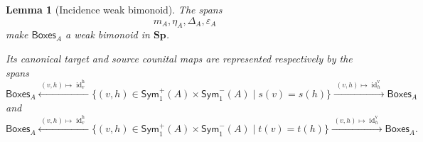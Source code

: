\documentclass[oneside]{article}
\newcommand{\Boxes}{\mathsf{Boxes}}
\newcommand{\Sym}{\mathsf{Sym}}
\newcommand{\Sp}{\mathbf{Sp}}
\newcommand{\id}{\operatorname{id}}
\theoremstyle{plain}
\newtheorem{lemma}[theorem]{Lemma}
\theoremstyle{definition}
\theoremstyle{remark}
\begin{document}
\begin{lemma}[Incidence weak bimonoid]
\label{lem:cgqg-game-incidence-weak-bimonoid}
    The spans
    \[
        m_A,\eta_A,\Delta_A,\varepsilon_A
    \]
    make \(\Boxes_A\) a weak bimonoid in \(\Sp\).

    Its canonical target and source counital maps are represented respectively by the spans
    \begin{equation}
        \Boxes_A
        \xleftarrow{\;(v,h)\mapsto\id_v^{\mathrm h}\;}
        \bigl\{
            (v,h)\in\Sym^+_1(A)\times\Sym^-_1(A)
            \mid s(v)=s(h)
        \bigr\}
        \xrightarrow{\;(v,h)\mapsto\id_h^{\mathrm v}\;}
        \Boxes_A
        \label{eq:cgqg-game-target-counital-map}
    \end{equation}
    and
    \begin{equation}
        \Boxes_A
        \xleftarrow{\;(v,h)\mapsto\id_v^{\mathrm h}\;}
        \bigl\{
            (v,h)\in\Sym^+_1(A)\times\Sym^-_1(A)
            \mid t(v)=t(h)
        \bigr\}
        \xrightarrow{\;(v,h)\mapsto\id_h^{\mathrm v}\;}
        \Boxes_A.
        \label{eq:cgqg-game-source-counital-map}
    \end{equation}
\end{lemma}
\end{document}
